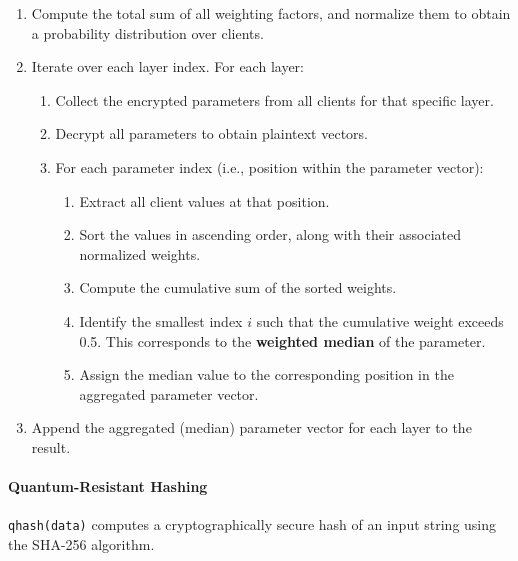 \documentclass[10pt]{article}
\begin{document}
\begin{enumerate}
  \item Compute the total sum of all weighting factors, and normalize them to obtain a probability distribution over clients.
  \item Iterate over each layer index. For each layer:
  \begin{enumerate}
    \item Collect the encrypted parameters from all clients for that specific layer.
    \item Decrypt all parameters to obtain plaintext vectors.
    \item For each parameter index (i.e., position within the parameter vector):
    \begin{enumerate}
      \item Extract all client values at that position.
      \item Sort the values in ascending order, along with their associated normalized weights.
      \item Compute the cumulative sum of the sorted weights.
      \item Identify the smallest index \( i \) such that the cumulative weight exceeds 0.5. This corresponds to the \textbf{weighted median} of the parameter.
      \item Assign the median value to the corresponding position in the aggregated parameter vector.
    \end{enumerate}
  \end{enumerate}
  \item Append the aggregated (median) parameter vector for each layer to the result.
\end{enumerate}

\paragraph{Quantum-Resistant Hashing}
\texttt{qhash(data)} computes a cryptographically secure hash of an input string using the SHA-256 algorithm.
\end{document}
